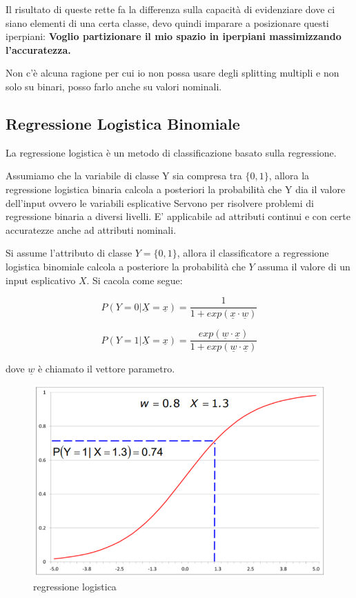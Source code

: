Il risultato di queste rette fa la differenza sulla capacità di evidenziare dove ci siano elementi di una certa classe, devo quindi imparare a posizionare questi iperpiani: \textbf{Voglio partizionare il mio spazio in iperpiani massimizzando l'accuratezza.}

Non c'è alcuna ragione per cui io non possa usare degli splitting multipli e non solo su binari, posso farlo anche su valori nominali.

\subsection{Regressione Logistica Binomiale}
La regressione logistica è un metodo di classificazione basato sulla regressione.

Assumiamo che la variabile di classe Y sia compresa tra $\{0,1\}$, allora la regressione logistica binaria calcola a posteriori la probabilità che Y dia il valore dell'input ovvero le variabili esplicative 
Servono per risolvere problemi di regressione binaria a diversi livelli. E' applicabile ad attributi continui e con certe accuratezze anche ad attributi nominali.

Si assume l'attributo di classe $Y = \{0,1\}$, allora il classificatore a regressione logistica binomiale calcola a posteriore la probabilit\`a che $Y$ assuma il valore di un input esplicativo \underline{$X$}. Si cacola come segue:

\[P(Y = 0 | \underline{X}= \underline{x}) = \frac{1}{1+exp(\underline{x} \cdot \underline{w})}\]

\[P(Y = 1 | \underline{X}= \underline{x}) = \frac{exp(\underline{w} \cdot \underline{x})}{1+exp(\underline{w} \cdot \underline{x})}\]

dove $\underline{w}$ \`e chiamato il vettore parametro.

\begin{figure}[H]
	\centering
	\includegraphics[height=0.5 \linewidth]{classification/pict/regr_logistic.png}
	\caption{regressione logistica}
\end{figure}

